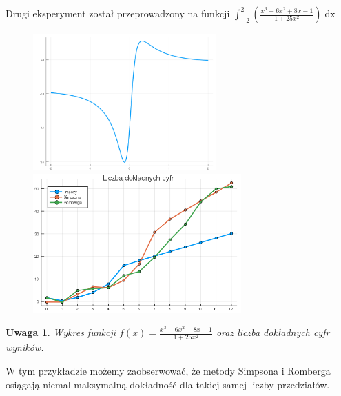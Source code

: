 \documentclass[11pt,wide]{article}
\newtheorem{remark}{Uwaga}
\begin{document}
Drugi eksperyment został przeprowadzony na funkcji \(\displaystyle \int_{-2}^{2} \left(\frac{x^3 - 6x^2 + 8x - 1}{1+25x^2}\right)\mathop{dx} \)
\begin{figure}[h!]
	\includegraphics[width=70mm,scale=0.5]{wym2}
	\includegraphics[width=80mm,scale=0.5]{wym_blad2}
\end{figure}
\begin{remark}
\centering
Wykres funkcji \(\displaystyle f(x) = \frac{x^3 - 6x^2 + 8x - 1}{1+25x^2} \) oraz liczba dokładnych cyfr wyników.
\end{remark}
W tym przykładzie możemy zaobserwować, że metody Simpsona i Romberga osiągają niemal maksymalną dokładność dla takiej samej liczby przedziałów.
\pagebreak
\end{document}
